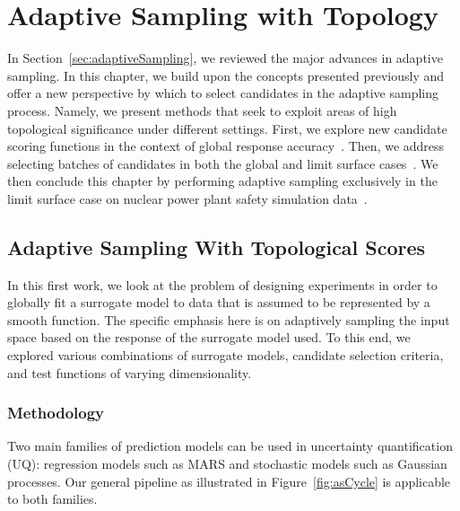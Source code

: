 
\chapter{Adaptive Sampling with Topology}
\label{ch:adaptiveSampling}

In Section~\ref{sec:adaptiveSampling}, we reviewed the major advances in adaptive sampling.
%
In this chapter, we build upon the concepts presented previously and offer a new perspective by which to select candidates in the adaptive sampling process.
%
Namely, we present methods that seek to exploit areas of high topological significance under different settings.
%
First, we explore new candidate scoring functions in the context of global response accuracy~\cite{MaljovecWangKupresanin2013}.
%
Then, we address selecting batches of candidates in both the global and limit surface cases~\cite{MaljovecWangMoeller2014}.
%
We then conclude this chapter by performing adaptive sampling exclusively in the limit surface case on nuclear power plant safety simulation data~\cite{MaljovecWangMandelli2013b}.

\section{Adaptive Sampling With Topological Scores}
\label{paper:ijuq2013}
In this first work, we look at the problem of designing experiments in order to globally fit a surrogate model to data that is assumed to be represented by a smooth function.
%
The specific emphasis here is on adaptively sampling the input space based on the response of the surrogate model used.
%
To this end, we explored various combinations of surrogate models, candidate selection criteria, and test functions of varying dimensionality.

\subsection{Methodology}

Two main families of prediction models can be used in uncertainty quantification (UQ): regression models such as MARS and stochastic models such as Gaussian processes.
%
Our general pipeline as illustrated in Figure~\ref{fig:asCycle} is applicable to both families.

